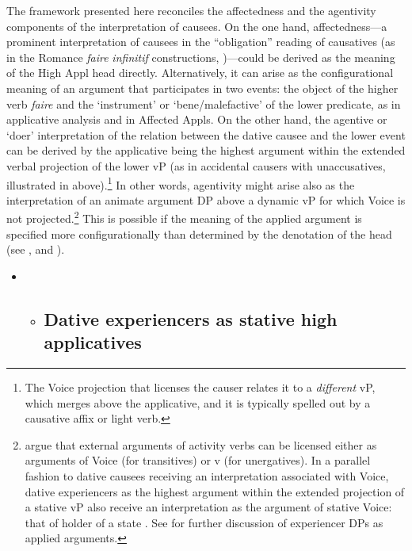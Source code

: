 \documentclass[output=paper,modfonts,nonflat]{langsci/langscibook}
\begin{document}
The framework presented here reconciles the affectedness and the agentivity components of the interpretation of causees. On the one hand, affectedness—a prominent interpretation of causees in the “obligation” reading of causatives (as in the Romance \textit{faire} \textit{infinitif} constructions, \citealt{FolliHarley2007})—could be derived as the meaning of the High Appl head directly. Alternatively, it can arise as the configurational meaning of an argument that participates in two events: the object of the higher verb \textit{faire} and the ‘instrument’ or ‘bene/malefactive’ of the lower predicate, as in  applicative analysis and in Affected Appls. On the other hand, the agentive or ‘doer’ interpretation of the relation between the dative causee and the lower event can be derived by the applicative being the highest argument within the extended verbal projection of the lower vP (as in accidental causers with unaccusatives, illustrated in  above).\footnote{The Voice projection that licenses the causer relates it to a \textit{different} vP, which merges above the applicative, and it is typically spelled out by a causative affix or light verb.} In other words, agentivity might arise also as the interpretation of an animate argument DP above a dynamic vP for which Voice is not projected.\footnote{\citet{TollanOxford2018} argue that external arguments of activity verbs can be licensed either as arguments of Voice (for transitives) or v (for unergatives). In a parallel fashion to dative causees receiving an interpretation associated with Voice, dative experiencers as the highest argument within the extended projection of a stative vP also receive an interpretation as the argument of stative Voice: that of holder of a state \citep{Kratzer1996}. See  for further discussion of experiencer DPs as applied arguments.} This is possible if the meaning of the applied argument is specified more configurationally than determined by the denotation of the head (see \citealt{Cuervo2015a}, and \citealt{WoodMarantz2017}). 

\begin{itemize}
\item \begin{itemize}
\item \subsection{Dative experiencers as stative high applicatives}
\end{itemize}
\end{itemize}
\end{document}
